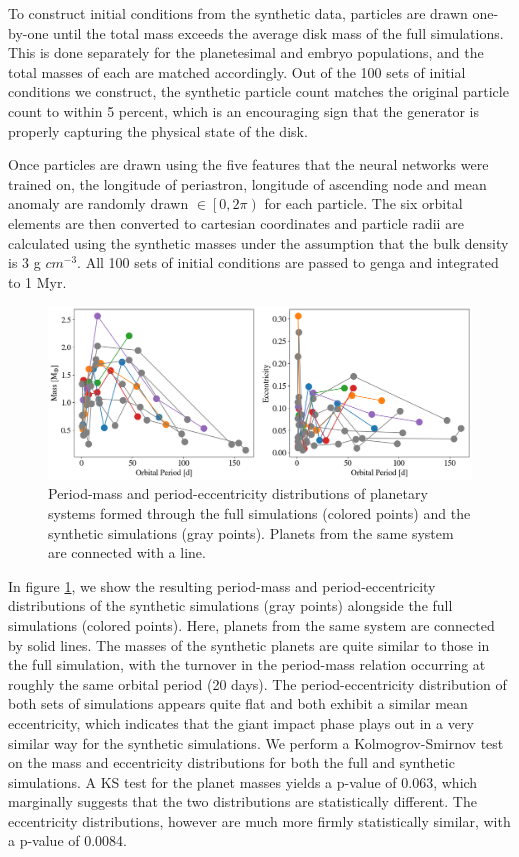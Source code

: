 To construct initial conditions from the synthetic data, particles are drawn one-by-one until the total mass exceeds the average disk mass of the full simulations. This is done separately for the planetesimal and embryo populations, and the total masses of each are matched accordingly. Out of the 100 sets of initial conditions we construct, the synthetic particle count matches the original particle count to within 5 percent, which is an encouraging sign that the generator is properly capturing the physical state of the disk.

Once particles are drawn using the five features that the neural networks were trained on, the longitude of periastron, longitude of ascending node and mean anomaly are randomly drawn $\in \left[0, 2 \pi \right)$ for each particle. The six orbital elements are then converted to cartesian coordinates and particle radii are calculated using the synthetic masses under the assumption that the bulk density is 3 g $cm^{-3}$. All 100 sets of initial conditions are passed to {\sc genga} and integrated to 1 Myr.

\begin{figure}
\begin{center}
    \includegraphics[width=\textwidth]{figures/stip/per_mass_ecc_syn_comp.png}
    \caption{Period-mass and period-eccentricity distributions of planetary systems formed through the full simulations (colored points) and the synthetic simulations (gray points). Planets from the same system are connected with a line.\label{fig:per_mass_ecc_syn_comp}}
\end{center}
\end{figure}

In figure \ref{fig:per_mass_ecc_syn_comp}, we show the resulting period-mass and period-eccentricity distributions of the synthetic simulations (gray points) alongside the full simulations (colored points). Here, planets from the same system are connected by solid lines. The masses of the synthetic planets are quite similar to those in the full simulation, with the turnover in the period-mass relation occurring at roughly the same orbital period (20 days). The period-eccentricity distribution of both sets of simulations appears quite flat and both exhibit a similar mean eccentricity, which indicates that the giant impact phase plays out in a very similar way for the synthetic simulations. We perform a Kolmogrov-Smirnov test on the mass and eccentricity distributions for both the full and synthetic simulations. A KS test for the planet masses yields a p-value of 0.063, which marginally suggests that the two distributions are statistically different. The eccentricity distributions, however are much more firmly statistically similar, with a p-value of 0.0084.

